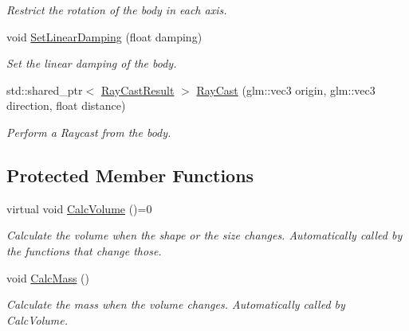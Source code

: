 \begin{DoxyCompactItemize}
\begin{DoxyCompactList}\small\item\em Restrict the rotation of the body in each axis. \end{DoxyCompactList}\item 
void \hyperlink{classTarbora_1_1RigidBody_a8140640963647cae49e1b9b78ab00b9b}{Set\+Linear\+Damping} (float damping)
\begin{DoxyCompactList}\small\item\em Set the linear damping of the body. \end{DoxyCompactList}\item 
std\+::shared\+\_\+ptr$<$ \hyperlink{structTarbora_1_1RayCastResult}{Ray\+Cast\+Result} $>$ \hyperlink{classTarbora_1_1RigidBody_afcb7edde5f51569c31385ccb75728e8a}{Ray\+Cast} (glm\+::vec3 origin, glm\+::vec3 direction, float distance)
\begin{DoxyCompactList}\small\item\em Perform a Raycast from the body. \end{DoxyCompactList}\end{DoxyCompactItemize}
\subsection*{Protected Member Functions}
\begin{DoxyCompactItemize}
\item 
\mbox{\label{classTarbora_1_1RigidBody_a5f3f505d69241d5dbac5fc3c94b07df0}} 
virtual void \hyperlink{classTarbora_1_1RigidBody_a5f3f505d69241d5dbac5fc3c94b07df0}{Calc\+Volume} ()=0
\begin{DoxyCompactList}\small\item\em Calculate the volume when the shape or the size changes. Automatically called by the functions that change those. \end{DoxyCompactList}\item 
\mbox{\label{classTarbora_1_1RigidBody_ad78189036d2270c9157fca92b741a0d8}} 
void \hyperlink{classTarbora_1_1RigidBody_ad78189036d2270c9157fca92b741a0d8}{Calc\+Mass} ()
\begin{DoxyCompactList}\small\item\em Calculate the mass when the volume changes. Automatically called by Calc\+Volume. \end{DoxyCompactList}\end{DoxyCompactItemize}
